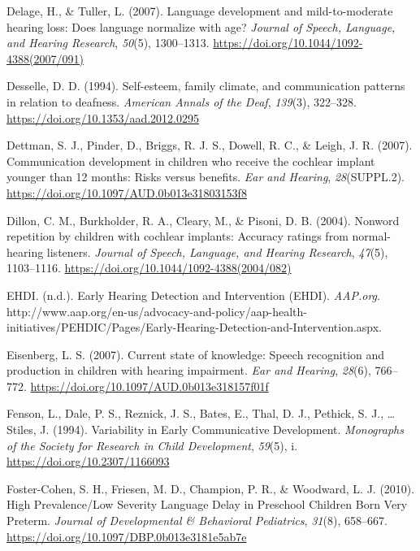 \documentclass[
  english,
  man]{apa6}
\begin{document}
\leavevmode\hypertarget{ref-delage2007}{}%
Delage, H., \& Tuller, L. (2007). Language development and mild-to-moderate hearing loss: Does language normalize with age? \emph{Journal of Speech, Language, and Hearing Research}, \emph{50}(5), 1300--1313. \url{https://doi.org/10.1044/1092-4388(2007/091)}

\leavevmode\hypertarget{ref-desselle1994}{}%
Desselle, D. D. (1994). Self-esteem, family climate, and communication patterns in relation to deafness. \emph{American Annals of the Deaf}, \emph{139}(3), 322--328. \url{https://doi.org/10.1353/aad.2012.0295}

\leavevmode\hypertarget{ref-dettman2007}{}%
Dettman, S. J., Pinder, D., Briggs, R. J. S., Dowell, R. C., \& Leigh, J. R. (2007). Communication development in children who receive the cochlear implant younger than 12 months: Risks versus benefits. \emph{Ear and Hearing}, \emph{28}(SUPPL.2). \url{https://doi.org/10.1097/AUD.0b013e31803153f8}

\leavevmode\hypertarget{ref-dillon2004}{}%
Dillon, C. M., Burkholder, R. A., Cleary, M., \& Pisoni, D. B. (2004). Nonword repetition by children with cochlear implants: Accuracy ratings from normal-hearing listeners. \emph{Journal of Speech, Language, and Hearing Research}, \emph{47}(5), 1103--1116. \url{https://doi.org/10.1044/1092-4388(2004/082)}

\leavevmode\hypertarget{ref-ehdi}{}%
EHDI. (n.d.). Early Hearing Detection and Intervention (EHDI). \emph{AAP.org}. http://www.aap.org/en-us/advocacy-and-policy/aap-health-initiatives/PEHDIC/Pages/Early-Hearing-Detection-and-Intervention.aspx.

\leavevmode\hypertarget{ref-eisenberg2007}{}%
Eisenberg, L. S. (2007). Current state of knowledge: Speech recognition and production in children with hearing impairment. \emph{Ear and Hearing}, \emph{28}(6), 766--772. \url{https://doi.org/10.1097/AUD.0b013e318157f01f}

\leavevmode\hypertarget{ref-fenson1994}{}%
Fenson, L., Dale, P. S., Reznick, J. S., Bates, E., Thal, D. J., Pethick, S. J., \ldots{} Stiles, J. (1994). Variability in Early Communicative Development. \emph{Monographs of the Society for Research in Child Development}, \emph{59}(5), i. \url{https://doi.org/10.2307/1166093}

\leavevmode\hypertarget{ref-foster-cohen2010}{}%
Foster-Cohen, S. H., Friesen, M. D., Champion, P. R., \& Woodward, L. J. (2010). High Prevalence/Low Severity Language Delay in Preschool Children Born Very Preterm. \emph{Journal of Developmental \& Behavioral Pediatrics}, \emph{31}(8), 658--667. \url{https://doi.org/10.1097/DBP.0b013e3181e5ab7e}
\end{document}
